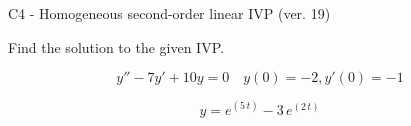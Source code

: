 \begin{exercise}
  \begin{exerciseTitle}C4 - Homogeneous second-order linear IVP (ver. 19)\end{exerciseTitle}
  \begin{exerciseStatement}
    
Find the solution to the given IVP.

    
\[y''-7y'+10y = 0 \hspace{1em} y(0) = -2 , y'(0) = -1\]

  \end{exerciseStatement}
  \begin{exerciseAnswer}
    
\[y= e^{\left(5 \, t\right)} - 3 \, e^{\left(2 \, t\right)}\]

  \end{exerciseAnswer}
\end{exercise}